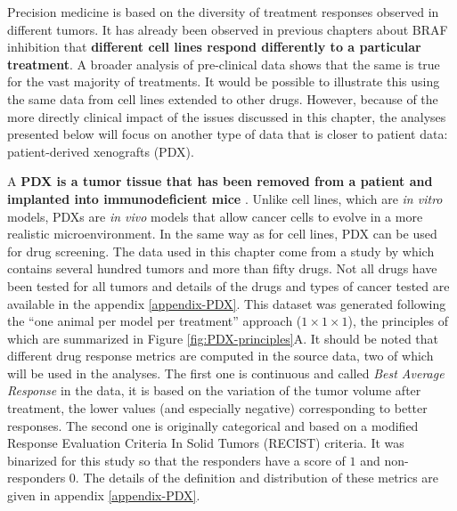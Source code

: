 \documentclass[a4paper,12pt,twoside,onecolumn,openright,final,oldfontcommands]{memoir}
\begin{document}
Precision medicine is based on the diversity of treatment responses
observed in different tumors. It has already been observed in previous
chapters about BRAF inhibition that \textbf{different cell lines respond
differently to a particular treatment}. A broader analysis of
pre-clinical data shows that the same is true for the vast majority of
treatments. It would be possible to illustrate this using the same data
from cell lines extended to other drugs. However, because of the more
directly clinical impact of the issues discussed in this chapter, the
analyses presented below will focus on another type of data that is
closer to patient data: patient-derived xenografts (PDX).

A \textbf{PDX is a tumor tissue that has been removed from a patient and
implanted into immunodeficient mice} \citep{hidalgo2014patient}. Unlike
cell lines, which are \emph{in vitro} models, PDXs are \emph{in vivo}
models that allow cancer cells to evolve in a more realistic
microenvironment. In the same way as for cell lines, PDX can be used for
drug screening. The data used in this chapter come from a study by
\citet{gao2015high} which contains several hundred tumors and more than
fifty drugs. Not all drugs have been tested for all tumors and details
of the drugs and types of cancer tested are available in the appendix
\ref{appendix-PDX}. This dataset was generated following the ``one
animal per model per treatment'' approach (\(1 \times 1 \times 1\)), the
principles of which are summarized in Figure \ref{fig:PDX-principles}A.
It should be noted that different drug response metrics are computed in
the source data, two of which will be used in the analyses. The first
one is continuous and called \emph{Best Average Response} in the data,
it is based on the variation of the tumor volume after treatment, the
lower values (and especially negative) corresponding to better
responses. The second one is originally categorical and based on a
modified Response Evaluation Criteria In Solid Tumors (RECIST) criteria.
It was binarized for this study so that the responders have a score of
\(1\) and non-responders \(0\). The details of the definition and
distribution of these metrics are given in appendix \ref{appendix-PDX}.
\end{document}

